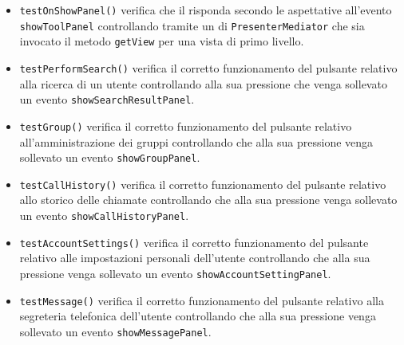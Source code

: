 \begin{itemize}
\begin{itemize}
\item \texttt{testOnShowPanel()} verifica che il  risponda secondo le aspettative all'evento \texttt{showToolPanel} controllando tramite un  di \texttt{PresenterMediator} che sia invocato il metodo \verb'getView' per una vista di primo livello.

\item \texttt{testPerformSearch()} verifica il corretto funzionamento del pulsante relativo alla ricerca di un utente controllando alla sua pressione che venga sollevato un evento \verb'showSearchResultPanel'.

\item \texttt{testGroup()} verifica il corretto funzionamento del pulsante relativo all'amministrazione dei gruppi controllando che alla sua pressione venga sollevato un evento \verb'showGroupPanel'.

\item \texttt{testCallHistory()} verifica il corretto funzionamento del pulsante relativo allo storico delle chiamate controllando che alla sua pressione venga sollevato un evento \verb'showCallHistoryPanel'.

\item \texttt{testAccountSettings()} verifica il corretto funzionamento del pulsante relativo alle impostazioni personali dell'utente controllando che alla sua pressione venga sollevato un evento \verb'showAccountSettingPanel'.

\item \texttt{testMessage()} verifica il corretto funzionamento del pulsante relativo alla segreteria telefonica dell'utente controllando che alla sua pressione venga sollevato un evento \verb'showMessagePanel'.

\end{itemize}

\end{itemize}

